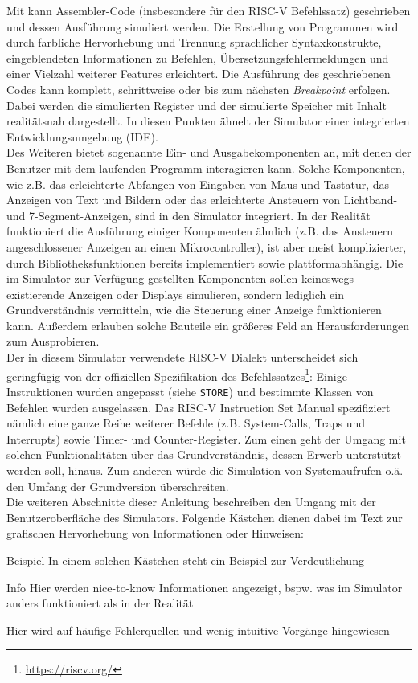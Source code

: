 Mit \erasim{} kann Assembler-Code (insbesondere für den RISC-V Befehlssatz)
geschrieben und dessen Ausführung simuliert werden. Die Erstellung von
Programmen wird durch farbliche Hervorhebung und Trennung sprachlicher
Syntaxkonstrukte, eingeblendeten Informationen zu Befehlen,
Übersetzungsfehlermeldungen und einer Vielzahl weiterer Features erleichtert.
Die Ausführung des geschriebenen Codes kann komplett, schrittweise oder bis zum
nächsten \emph{Breakpoint} erfolgen. Dabei werden die simulierten Register und
der simulierte Speicher mit Inhalt realitätsnah dargestellt. In diesen Punkten
ähnelt der Simulator einer integrierten Entwicklungsumgebung (IDE).\\ Des
Weiteren bietet \erasim{} sogenannte Ein- und Ausgabekomponenten an, mit denen
der Benutzer mit dem laufenden Programm interagieren kann. Solche Komponenten,
wie z.B. das erleichterte Abfangen von Eingaben von Maus und Tastatur, das
Anzeigen von Text und Bildern oder das erleichterte Ansteuern von Lichtband- und
7-Segment-Anzeigen, sind in den Simulator integriert. In der Realität
funktioniert die Ausführung einiger Komponenten ähnlich (z.B. das Ansteuern
angeschlossener Anzeigen an einen Mikrocontroller), ist aber meist
komplizierter, durch Bibliotheksfunktionen bereits implementiert sowie
plattformabhängig. Die im Simulator zur Verfügung gestellten Komponenten sollen
keineswegs existierende Anzeigen oder Displays simulieren, sondern lediglich ein
Grundverständnis vermitteln, wie die Steuerung einer Anzeige funktionieren kann.
Außerdem erlauben solche Bauteile ein größeres Feld an Herausforderungen zum
Ausprobieren.\\ Der in diesem Simulator verwendete RISC-V Dialekt unterscheidet
sich geringfügig von der offiziellen Spezifikation des
Befehlssatzes\footnote{\url{https://riscv.org/}}: Einige Instruktionen wurden
angepasst (siehe \texttt{STORE}) und bestimmte Klassen von Befehlen wurden
ausgelassen. Das RISC-V Instruction Set Manual spezifiziert nämlich eine ganze
Reihe weiterer Befehle (z.B. System-Calls, Traps und Interrupts) sowie Timer-
und Counter-Register. Zum einen geht der Umgang mit solchen Funktionalitäten
über das Grundverständnis, dessen Erwerb unterstützt werden soll, hinaus. Zum
anderen würde die Simulation von Systemaufrufen o.ä. den Umfang der Grundversion
überschreiten.\\

Die weiteren Abschnitte dieser Anleitung beschreiben den Umgang mit der
Benutzeroberfläche des Simulators. Folgende Kästchen dienen dabei im Text zur
grafischen Hervorhebung von Informationen oder Hinweisen:
\begin{exampleblock}{Beispiel}
	In einem solchen Kästchen steht ein Beispiel zur Verdeutlichung
\end{exampleblock}

\begin{infoblock}{Info}
	Hier werden nice-to-know Informationen angezeigt, bspw. was im Simulator anders funktioniert als in der Realität
\end{infoblock}

\begin{warningblock}
	Hier wird auf häufige Fehlerquellen und wenig intuitive Vorgänge hingewiesen
\end{warningblock}
